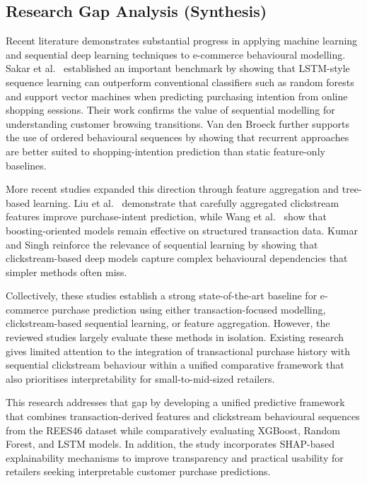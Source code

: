 \documentclass[12pt,a4paper]{article}
\begin{document}
\subsection{Research Gap Analysis (Synthesis)}

Recent literature demonstrates substantial progress in applying machine learning and
sequential deep learning techniques to e-commerce behavioural modelling. Sakar et al.\
\cite{sakar2019realtime} established an important benchmark by showing that LSTM-style
sequence learning can outperform conventional classifiers such as random forests and
support vector machines when predicting purchasing intention from online shopping
sessions. Their work confirms the value of sequential modelling for understanding
customer browsing transitions. Van den Broeck \cite{broeck2020sequential} further
supports the use of ordered behavioural sequences by showing that recurrent approaches
are better suited to shopping-intention prediction than static feature-only baselines.

More recent studies expanded this direction through feature aggregation and tree-based
learning. Liu et al.\ \cite{liu2023feature} demonstrate that carefully aggregated
clickstream features improve purchase-intent prediction, while Wang et al.\
\cite{wang2025sales} show that boosting-oriented models remain effective on structured
transaction data. Kumar and Singh \cite{kumar2026clickstream} reinforce the relevance of
sequential learning by showing that clickstream-based deep models capture complex
behavioural dependencies that simpler methods often miss.

Collectively, these studies establish a strong state-of-the-art baseline for e-commerce
purchase prediction using either transaction-focused modelling, clickstream-based
sequential learning, or feature aggregation. However, the reviewed studies largely
evaluate these methods in isolation. Existing research gives limited attention to the
integration of transactional purchase history with sequential clickstream behaviour
within a unified comparative framework that also prioritises interpretability for
small-to-mid-sized retailers.

This research addresses that gap by developing a unified predictive framework that
combines transaction-derived features and clickstream behavioural sequences from the
REES46 dataset while comparatively evaluating XGBoost, Random Forest, and LSTM
models. In addition, the study incorporates SHAP-based explainability mechanisms to
improve transparency and practical usability for retailers seeking interpretable customer
purchase predictions.
\end{document}

